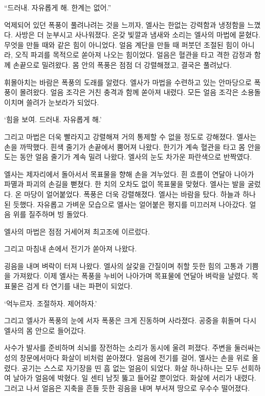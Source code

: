 \textbreak

\forceindent``드러내. 자유롭게 해. 한계는 없어.''

억제되어 있던 폭풍이 풀려나려는 것을 느끼자, 엘사는 한없는 강력함과 냉정함을 느꼈다. 사방은 더 눈부시고 사나워졌다. 온갖 빛깔과 냄새와 소리는 엘사의 마법에 묻혔다. 무엇을 만들 때와 같은 힘이 아니었다. 얼음 계단을 만들 때 퍼붓던 조절된 힘이 아니라, 오직 파괴를 목적으로 쏟아져 나오는 힘이었다. 얼음은 혈관을 타고 격한 감정과 함께 손끝으로 밀려왔다. 몸 안의 폭풍은 점점 더 강렬해졌고, 결국은 풀려났다.

휘몰아치는 바람은 폭풍의 도래를 알렸다. 엘사가 마법을 수련하고 있는 안마당으로 폭풍이 몰려왔다. 얼음 조각은 거친 충격과 함께 쏟아져 내렸다. 모든 얼음 조각은 소용돌이치며 쓸려가 눈보라가 되었다.

`힘을 보여. 드러내. 자유롭게 해.'

그리고 마법은 더욱 빨라지고 강렬해져 거의 통제할 수 없을 정도로 강해졌다. 엘사는 손을 까딱했다. 흰색 줄기가 손끝에서 뿜어져 나왔다. 한기가 계속 혈관을 타고 몸 안을 도는 동안 얼음 줄기가 계속 밀려 나왔다. 엘사의 눈도 차가운 파란색으로 반짝였다.

엘사는 제자리에서 돌아서서 목표물을 향해 손을 겨누었다. 흰 흐름이 연달아 나아가 파멸과 파괴의 손길을 뻗쳤다. 한 치의 오차도 없이 목표물을 맞혔다. 엘사는 발을 굴렀다. 온 마당이 얼어붙었다. 폭풍은 더욱 강렬해졌다. 엘사는 바람을 탔다. 하늘과 하나 된 듯했다. 자유롭고 가벼운 모습으로 엘사는 얼어붙은 평지를 미끄러져 나아갔다. 얼음 위를 질주하며 빙 돌았다.

엘사의 마법은 점점 거세어져 최고조에 이르렀다.

그리고 마침내 손에서 전기가 쏟아져 나왔다.

굉음을 내며 벼락이 터져 나왔다. 엘사의 살갗을 간질이며 취할 듯한 힘의 고통과 기쁨을 가져왔다. 이제 엘사는 폭풍을 누비어 나아가며 목표물에 연달아 벼락을 날렸다. 목표물은 검게 타 연기를 내는 파편이 되었다.

`억누르자. 조절하자. 제어하자.'

그리고 엘사가 폭풍의 눈에 서자 폭풍은 크게 진동하며 사라졌다. 공중을 휘돌며 다시 엘사의 몸 안으로 들어갔다.

사수가 발사를 준비하며 쇠뇌를 장전하는 소리가 동시에 울려 퍼졌다. 주변을 둘러싸는 성의 창문에서마다 화살이 비처럼 쏟아졌다. 얼음에 전기를 걸어, 엘사는 손을 위로 올렸다. 공기는 스스로 자기장을 띤 흠 없는 얼음이 되었다. 화살 하나하나는 모두 선회하여 날아가 얼음에 박혔다. 일 센티 남짓 뚫고 들어갈 뿐이었다. 화살에 서리가 내렸다. 그러고 나서 얼음은 지축을 흔들 듯한 굉음을 내며 부서져 땅으로 우수수 떨어졌다.

